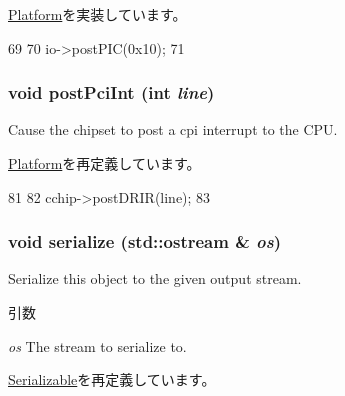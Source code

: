 \hyperlink{classPlatform_a24ab6780a0fa391b19980027355ba467}{Platform}を実装しています。


\begin{DoxyCode}
69 {
70     io->postPIC(0x10);
71 }
\end{DoxyCode}
\hypertarget{classTsunami_a545d1445357706d7259aa73104f44222}{
\subsubsection[{postPciInt}]{\setlength{\rightskip}{0pt plus 5cm}void postPciInt (int {\em line})}}
\label{classTsunami_a545d1445357706d7259aa73104f44222}
Cause the chipset to post a cpi interrupt to the CPU. 

\hyperlink{classPlatform_a545d1445357706d7259aa73104f44222}{Platform}を再定義しています。


\begin{DoxyCode}
81 {
82     cchip->postDRIR(line);
83 }
\end{DoxyCode}
\hypertarget{classTsunami_a53e036786d17361be4c7320d39c99b84}{
\subsubsection[{serialize}]{\setlength{\rightskip}{0pt plus 5cm}void serialize (std::ostream \& {\em os})}}
\label{classTsunami_a53e036786d17361be4c7320d39c99b84}
Serialize this object to the given output stream. 
\begin{DoxyParams}{引数}
\item[{\em os}]The stream to serialize to. \end{DoxyParams}


\hyperlink{classSerializable_ad6272f80ae37e8331e3969b3f072a801}{Serializable}を再定義しています。


